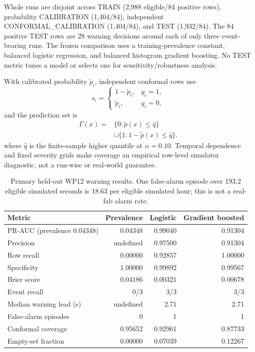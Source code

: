 \documentclass[10pt,twocolumn]{article}
\begin{document}
Whole runs are disjoint across TRAIN (2,988 eligible/84 positive rows),
probability CALIBRATION (1,404/84), independent
CONFORMAL\_CALIBRATION (1,404/84), and TEST (1,932/84). The 84 positive TEST
rows are 28 warning decisions around each of only three event-bearing runs.
The frozen comparison uses a training-prevalence constant, balanced logistic
regression, and balanced histogram gradient boosting. No TEST metric tunes a
model or selects one for sensitivity/robustness analysis.

With calibrated probability $\tilde p_i$, independent conformal rows use
\begin{equation}
s_i=\begin{cases}
1-\tilde p_i,&y_i=1,\\
\tilde p_i,&y_i=0,
\end{cases}
\label{eq:warning-conformal}
\end{equation}
and the prediction set is
\begin{equation}
\begin{aligned}
\Gamma(x)={}&\{0:\tilde p(x)\leq\hat q\}\\
&\cup\{1:1-\tilde p(x)\leq\hat q\}.
\end{aligned}
\label{eq:warning-set}
\end{equation}
where $\hat q$ is the finite-sample higher quantile at $\alpha=0.10$.
Temporal dependence and fixed severity grids make coverage an empirical
row-level simulator diagnostic, not a run-wise or real-world guarantee.

\begin{table}[t]
\centering
\caption{Primary held-out WP12 warning results. One false-alarm episode over
193.2 eligible simulated seconds is 18.63 per eligible simulated hour; this is
not a real-fab alarm rate.}
\label{tab:wp12-primary}
\small
\begin{tabular}{lrrr}
\toprule
Metric & Prevalence & Logistic & Gradient boosted\\
\midrule
PR-AUC (prevalence 0.04348) & 0.04348 & 0.99040 & 0.91304\\
Precision & undefined & 0.97500 & 0.91304\\
Row recall & 0.00000 & 0.92857 & 1.00000\\
Specificity & 1.00000 & 0.99892 & 0.99567\\
Brier score & 0.04186 & 0.00321 & 0.00678\\
Event recall & 0/3 & 3/3 & 3/3\\
Median warning lead (s) & undefined & 2.71 & 2.71\\
False-alarm episodes & 0 & 1 & 1\\
Conformal coverage & 0.95652 & 0.92961 & 0.87733\\
Empty-set fraction & 0.00000 & 0.07039 & 0.12267\\
\bottomrule
\end{tabular}
\end{table}
\end{document}
